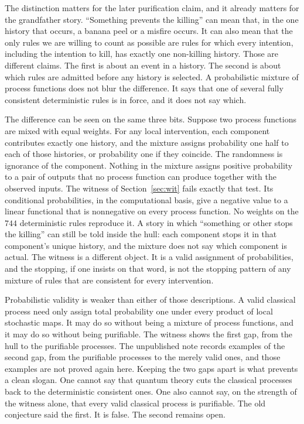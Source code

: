 \documentclass[11pt]{article}
\begin{document}
The distinction matters for the later purification claim, and it already matters for the grandfather story. ``Something prevents the killing'' can mean that, in the one history that occurs, a banana peel or a misfire occurs. It can also mean that the only rules we are willing to count as possible are rules for which every intention, including the intention to kill, has exactly one non-killing history. Those are different claims. The first is about an event in a history. The second is about which rules are admitted before any history is selected. A probabilistic mixture of process functions does not blur the difference. It says that one of several fully consistent deterministic rules is in force, and it does not say which.

The difference can be seen on the same three bits. Suppose two process functions are mixed with equal weights. For any local intervention, each component contributes exactly one history, and the mixture assigns probability one half to each of those histories, or probability one if they coincide. The randomness is ignorance of the component. Nothing in the mixture assigns positive probability to a pair of outputs that no process function can produce together with the observed inputs. The witness of Section~\ref{sec:wit} fails exactly that test. Its conditional probabilities, in the computational basis, give a negative value to a linear functional that is nonnegative on every process function. No weights on the \(744\) deterministic rules reproduce it. A story in which ``something or other stops the killing'' can still be told inside the hull: each component stops it in that component's unique history, and the mixture does not say which component is actual. The witness is a different object. It is a valid assignment of probabilities, and the stopping, if one insists on that word, is not the stopping pattern of any mixture of rules that are consistent for every intervention.

Probabilistic validity is weaker than either of those descriptions. A valid classical process need only assign total probability one under every product of local stochastic maps. It may do so without being a mixture of process functions, and it may do so without being purifiable. The witness shows the first gap, from the hull to the purifiable processes. The unpublished note records examples of the second gap, from the purifiable processes to the merely valid ones, and those examples are not proved again here. Keeping the two gaps apart is what prevents a clean slogan. One cannot say that quantum theory cuts the classical processes back to the deterministic consistent ones. One also cannot say, on the strength of the witness alone, that every valid classical process is purifiable. The old conjecture said the first. It is false. The second remains open.
\end{document}
